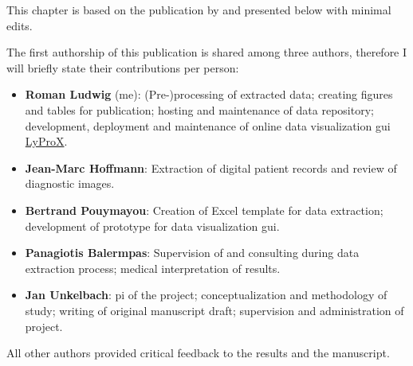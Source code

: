 \begin{tcolorbox}[title=\faIcon{users} Contributions, parbox=false]
    This chapter is based on the publication \textbf{} by \citeauthor{ludwig_detailed_2021} \cite{ludwig_detailed_2021} and presented below with minimal edits.
    
    The first authorship of this publication is shared among three authors, therefore I will briefly state their contributions per person:

    \begin{itemize}[leftmargin=5.5mm]
        \item[\faIcon{user}] \textbf{Roman Ludwig} (me): (Pre-)processing of extracted data; creating figures and tables for publication; hosting and maintenance of data repository; development, deployment and maintenance of online data visualization \gls{gui} \href{https://lyprox.org}{ LyProX}.
        \item[\faIcon{user}] \textbf{Jean-Marc Hoffmann}: Extraction of digital patient records and review of diagnostic images.
        \item[\faIcon{user}] \textbf{Bertrand Pouymayou}: Creation of Excel template for data extraction; development of prototype for data visualization \gls{gui}.
        \item[\faIcon{user}] \textbf{Panagiotis Balermpas}: Supervision of and consulting during data extraction process; medical interpretation of results.
        \item[\faIcon{user}] \textbf{Jan Unkelbach}: \Gls{pi} of the project; conceptualization and methodology of study; writing of original manuscript draft; supervision and administration of project.
    \end{itemize}

    All other authors provided critical feedback to the results and the manuscript.
\end{tcolorbox}

